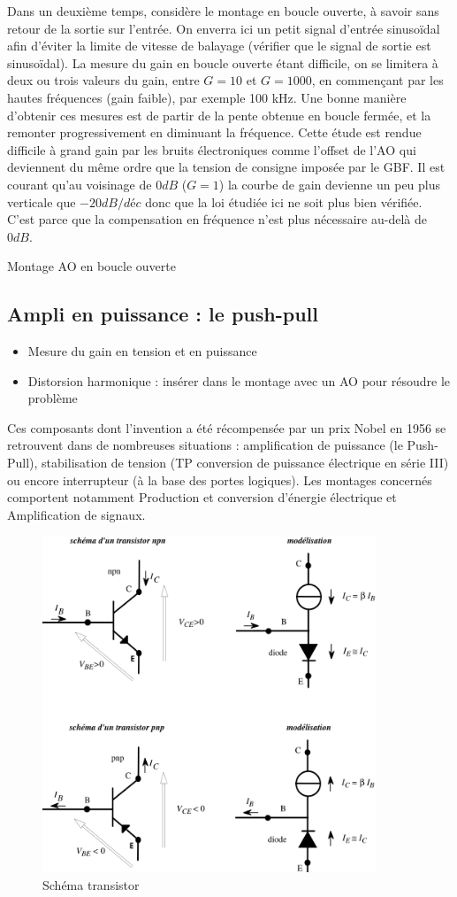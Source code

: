 \documentclass{article}%
\begin{document}
Dans un deuxième temps, considère le montage en boucle ouverte, à savoir sans retour de la sortie sur l'entrée. On enverra ici un petit signal d'entrée sinusoïdal afin d'éviter la limite de vitesse de balayage (vérifier que le signal de sortie est sinusoïdal). La mesure du gain en boucle ouverte étant difficile, on se limitera à deux ou trois valeurs du gain, entre $ G = 10$ et $G = 1 000$, en commençant par les hautes fréquences (gain faible), par exemple 100 kHz. Une bonne manière d'obtenir ces mesures est de partir de la pente obtenue en boucle fermée, et la remonter progressivement en diminuant la fréquence. Cette étude est rendue difficile à grand gain par les bruits électroniques comme l'offset de l'AO qui deviennent du même ordre que la tension de consigne imposée par le GBF. Il est courant qu'au voisinage de $ 0 dB$ ($G = 1$) la courbe de gain devienne un peu plus verticale que $ -20 dB/déc$ donc que la loi étudiée ici ne soit plus bien vérifiée. C'est parce que la compensation en fréquence n'est plus nécessaire au-delà de $ 0 dB$.


Montage AO en boucle ouverte


\subsection{Ampli en puissance : le push-pull}
\begin{itemize}
\item Mesure du gain en tension et en puissance
\item Distorsion harmonique : insérer dans le montage avec un AO pour résoudre le problème
\end{itemize}

Ces composants dont l'invention a été récompensée par un prix Nobel en 1956 se retrouvent dans de nombreuses situations : amplification de puissance (le Push-Pull), stabilisation de tension (TP conversion de puissance électrique en série III) ou encore interrupteur (à la base des portes logiques). Les montages concernés comportent notamment Production et conversion d'énergie électrique et Amplification de signaux.
\begin{figure}
	\centerline{\includegraphics[width=10cm]{images-exp/schema_transistor.png}}
	\caption{Schéma transistor}
\end{figure}
\end{document}
